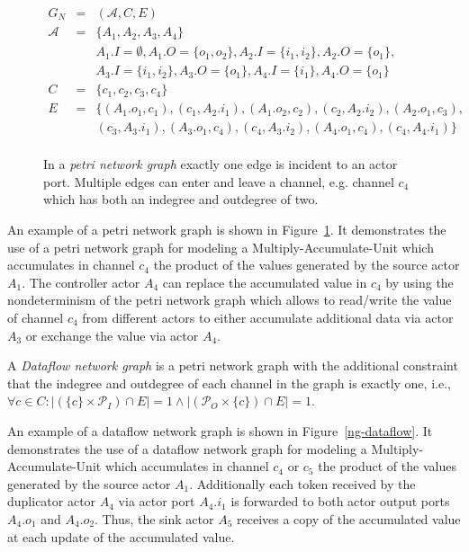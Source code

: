 \begin{figure}
\centering

\begin{displaymath}
\begin{array}{rcl}
  G_N & = & (\mathcal{A},C,E) \\
  \mathcal{A} & = & \{A_1,A_2,A_3,A_4\} \\
      &   & A_1.I = \emptyset, A_1.O=\{o_1,o_2\}, A_2.I = \{i_1,i_2\}, A_2.O=\{o_1\},\\
      &   & A_3.I = \{i_1,i_2\}, A_3.O=\{o_1\},A_4.I = \{i_1\}, A_4.O=\{o_1\}\\
  C   & = & \{c_1,c_2,c_3,c_4\} \\
  E   & = & \{(A_1.o_1,c_1),(c_1,A_2.i_1),(A_1.o_2,c_2),(c_2,A_2.i_2),(A_2.o_1,c_3),\\
      &   &   (c_3,A_3.i_1),(A_3.o_1,c_4),(c_4,A_3.i_2),(A_4.o_1,c_4),(c_4,A_4.i_1)\}\\
\end{array}
\end{displaymath}
\caption{\label{ng-petri}In a \emph{petri network graph} exactly
  one edge is incident to an actor port. Multiple edges can
  enter and leave a channel, e.g. channel $c_4$
  which has both an indegree and outdegree of two.}
\end{figure}

  An example of a petri network graph is shown in Figure~\ref{ng-petri}.
  It demonstrates the use of a petri network graph for modeling
  a Multiply-Accumulate-Unit which accumulates in channel $c_4$ the product of
  the values generated by the source actor $A_1$.
  The controller actor $A_4$ can replace the
  accumulated value in $c_4$ by using the nondeterminism
  of the petri network graph which allows to read/write the value of channel
  $c_4$ from different actors to either accumulate additional
  data via actor $A_3$ or exchange the value via actor $A_4$.

\begin{definition}\label{dataflow-network-graph}
  A \emph{Dataflow network graph} is a petri network graph with the additional constraint
  that the indegree and outdegree of each channel in the graph is exactly one, i.e.,
  $\forall{c \in C}: |(\{c\} \times \mathcal{P}_I) \cap E| = 1 \wedge
                    |(\mathcal{P}_O \times \{c\}) \cap E| = 1$.
\end{definition}

  An example of a dataflow network graph is shown in Figure~\ref{ng-dataflow}.
  It demonstrates the use of a dataflow network graph for modeling
  a Multiply-Accumulate-Unit which accumulates in channel $c_4$ or $c_5$ the product of
  the values generated by the source actor $A_1$.
  Additionally each token received by the duplicator actor $A_4$ via actor port $A_4.i_1$
  is forwarded to both actor output ports $A_4.o_1$ and $A_4.o_2$.
  Thus, the sink actor $A_5$ receives a copy of the accumulated value at
  each update of the accumulated value.

